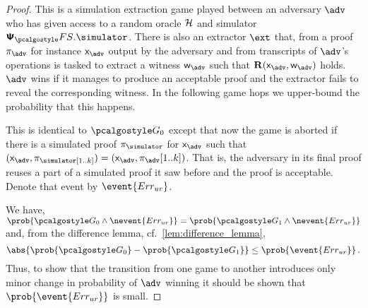 \documentclass[runningheads,10pt]{llncs}
\begin{document}
\begin{proof}		

   This is a simulation extraction game played between an adversary
  $\advse$ who has given access to a random oracle $\mathcal{H}$ and simulator
  $\psfs.\simulator$. There is also an extractor $\ext$ that, from a proof
  $\zkproof_{\advse}$ for instance $\inp_{\advse}$ output by the adversary and from
   transcripts of $\advse$'s operations is tasked to extract a witness
  $\wit_{\advse}$ such that $\REL(\inp_{\advse}, \wit_{\advse})$ holds. $\advse$ wins
  if it manages to produce an acceptable proof and the extractor fails to reveal
  the corresponding witness. In the following game hops we upper-bound the
  probability that this happens.

   This is identical to $\game{0}$ except that now the game is aborted
  if there is a simulated proof $\zkproof_\simulator$ for $\inp_{\advse}$ such
  that $(\inp_{\advse}, \zkproof_\simulator[1..k]) = (\inp_{\advse},
  \zkproof_{\advse}[1..k])$. That is, the adversary in its final proof
  reuses a part of a simulated proof it saw before and the proof is acceptable.
  Denote that event by $\event{\errur}$.

   We have, \( \prob{\game{0} \land
    \nevent{\errur}} = \prob{\game{1} \land \nevent{\errur}} \) and, from the
  difference lemma, cf.~\cref{lem:difference_lemma},
  \[ \abs{\prob{\game{0}} - \prob{\game{1}}} \leq \prob{\event{\errur}}\,. \]
  Thus, to show that the transition from one game to another introduces only
  minor change in probability of $\advse$ winning it should be shown that
  $\prob{\event{\errur}}$ is small.


\end{proof}
\end{document}
